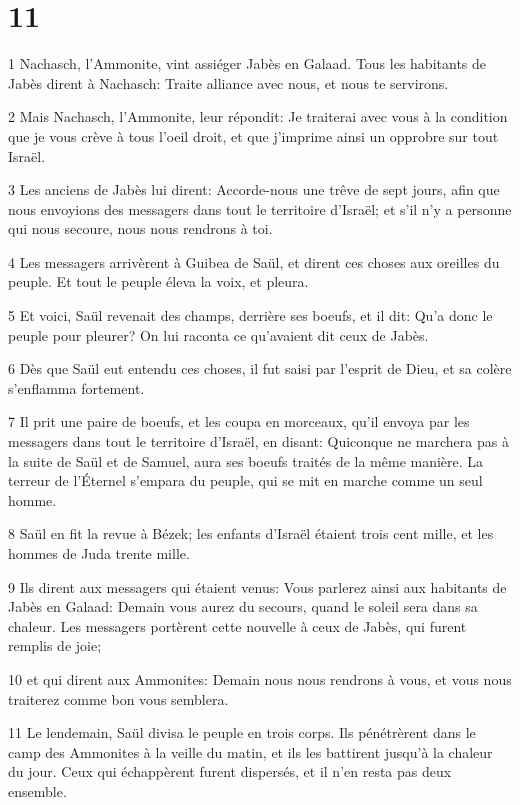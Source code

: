 \chapter{11}

\par 1 Nachasch, l'Ammonite, vint assiéger Jabès en Galaad. Tous les habitants de Jabès dirent à Nachasch: Traite alliance avec nous, et nous te servirons.
\par 2 Mais Nachasch, l'Ammonite, leur répondit: Je traiterai avec vous à la condition que je vous crève à tous l'oeil droit, et que j'imprime ainsi un opprobre sur tout Israël.
\par 3 Les anciens de Jabès lui dirent: Accorde-nous une trêve de sept jours, afin que nous envoyions des messagers dans tout le territoire d'Israël; et s'il n'y a personne qui nous secoure, nous nous rendrons à toi.
\par 4 Les messagers arrivèrent à Guibea de Saül, et dirent ces choses aux oreilles du peuple. Et tout le peuple éleva la voix, et pleura.
\par 5 Et voici, Saül revenait des champs, derrière ses boeufs, et il dit: Qu'a donc le peuple pour pleurer? On lui raconta ce qu'avaient dit ceux de Jabès.
\par 6 Dès que Saül eut entendu ces choses, il fut saisi par l'esprit de Dieu, et sa colère s'enflamma fortement.
\par 7 Il prit une paire de boeufs, et les coupa en morceaux, qu'il envoya par les messagers dans tout le territoire d'Israël, en disant: Quiconque ne marchera pas à la suite de Saül et de Samuel, aura ses boeufs traités de la même manière. La terreur de l'Éternel s'empara du peuple, qui se mit en marche comme un seul homme.
\par 8 Saül en fit la revue à Bézek; les enfants d'Israël étaient trois cent mille, et les hommes de Juda trente mille.
\par 9 Ils dirent aux messagers qui étaient venus: Vous parlerez ainsi aux habitants de Jabès en Galaad: Demain vous aurez du secours, quand le soleil sera dans sa chaleur. Les messagers portèrent cette nouvelle à ceux de Jabès, qui furent remplis de joie;
\par 10 et qui dirent aux Ammonites: Demain nous nous rendrons à vous, et vous nous traiterez comme bon vous semblera.
\par 11 Le lendemain, Saül divisa le peuple en trois corps. Ils pénétrèrent dans le camp des Ammonites à la veille du matin, et ils les battirent jusqu'à la chaleur du jour. Ceux qui échappèrent furent dispersés, et il n'en resta pas deux ensemble.
